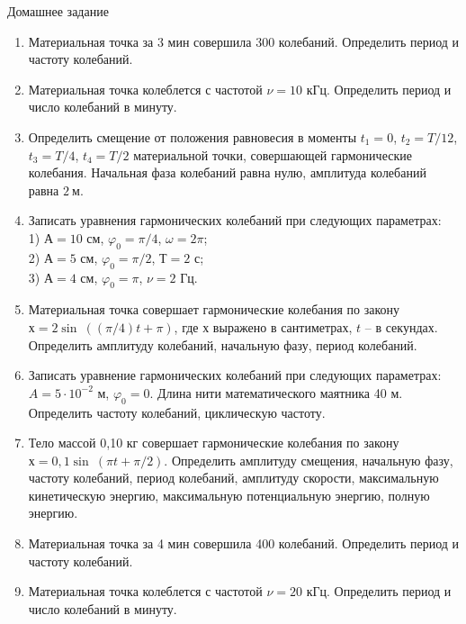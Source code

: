 \documentclass[a6paper, 11pt]{diss_4}
\renewcommand{\'}{\,'}
\begin{document}
\begin{center}
   Домашнее задание
\end{center}
\begin{enumerate}

\item Материальная точка за 3 мин совершила 300 колебаний. Определить период и частоту колебаний.

\item Материальная точка колеблется с частотой $\nu=10$ кГц. Определить период и число колебаний в минуту.

\item Определить смещение от положения равновесия в моменты $t_1=0$, $t_2=T/12$, $t_3=T/4$, $t_4=T/2$ материальной точки, совершающей гармонические колебания. Начальная фаза колебаний равна нулю, амплитуда колебаний равна $2\ м$.

\item Записать уравнения гармонических колебаний при следующих параметрах: \\
1) $А=10$ см, $\varphi_0= \pi/4$, $\omega=2\pi$; \\
2) $А=5$  см, $\varphi_0= \pi/2$, $Т=2$ с; \\
3) $А=4$  см, $\varphi_0= \pi$,   $\nu=2$ Гц.

\item Материальная точка совершает гармонические колебания по закону $х=2\sin\ ((\pi/4)t+\pi)$, где $х$ выражено в сантиметрах, $t$ -- в секундах. Определить амплитуду колебаний, начальную фазу, период колебаний.

\item Записать уравнение гармонических колебаний при следующих параметрах: $A=5\cdot10^{-2}$ м, $\varphi_0=0$. Длина нити математического маятника 40 м.  Определить частоту колебаний, циклическую частоту.

\item Тело массой 0,10 кг совершает гармонические колебания по закону $х=0,1\sin\ (\pi t+\pi/2)$. Определить амплитуду смещения, начальную фазу, частоту колебаний, период колебаний, амплитуду скорости, максимальную кинетическую энергию, максимальную потенциальную энергию, полную энергию.

\item Материальная точка за 4 мин совершила 400 колебаний. Определить период и частоту колебаний.

\item Материальная точка колеблется с частотой $\nu=20$ кГц. Определить период и число колебаний в минуту.


\end{enumerate}
\end{document}

